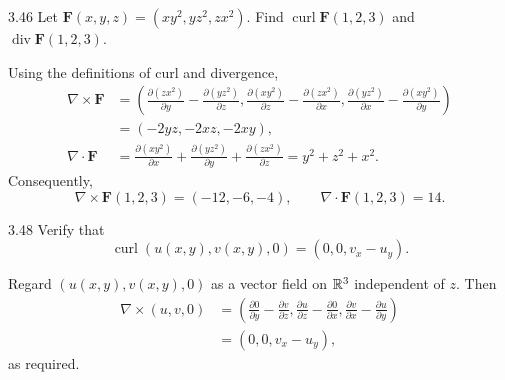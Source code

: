 \documentclass[11pt,oneside]{article}
\begin{document}

\begin{problem}{3.46}
Let $\mathbf F(x,y,z)=(xy^2,yz^2,zx^2)$. Find
$\operatorname{curl}\mathbf F(1,2,3)$ and
$\operatorname{div}\mathbf F(1,2,3)$.
\end{problem}
\begin{solution}
Using the definitions of curl and divergence,
\[
\begin{aligned}
\nabla\times\mathbf F
 &=\left(\frac{\partial(zx^2)}{\partial y}-\frac{\partial(yz^2)}{\partial z},
          \frac{\partial(xy^2)}{\partial z}-\frac{\partial(zx^2)}{\partial x},
          \frac{\partial(yz^2)}{\partial x}-\frac{\partial(xy^2)}{\partial y}\right)\\
 &=(-2yz,-2xz,-2xy),\\
\nabla\cdot\mathbf F
 &=\frac{\partial(xy^2)}{\partial x}
   +\frac{\partial(yz^2)}{\partial y}
   +\frac{\partial(zx^2)}{\partial z}
 =y^2+z^2+x^2.
\end{aligned}
\]
Consequently,
\[
\boxed{\nabla\times\mathbf F(1,2,3)=(-12,-6,-4)},
\qquad
\boxed{\nabla\cdot\mathbf F(1,2,3)=14}.
\]
\end{solution}

\begin{problem}{3.48}
Verify that
\[
\operatorname{curl}(u(x,y),v(x,y),0)=(0,0,v_x-u_y).
\]
\end{problem}
\begin{solution}
Regard $(u(x,y),v(x,y),0)$ as a vector field on $\mathbb{R}^3$ independent
of $z$. Then
\[
\begin{aligned}
\nabla\times(u,v,0)
 &=\left(\frac{\partial 0}{\partial y}-\frac{\partial v}{\partial z},
          \frac{\partial u}{\partial z}-\frac{\partial 0}{\partial x},
          \frac{\partial v}{\partial x}-\frac{\partial u}{\partial y}\right)\\
 &=\boxed{(0,0,v_x-u_y)},
\end{aligned}
\]
as required.
\end{solution}
\end{document}
